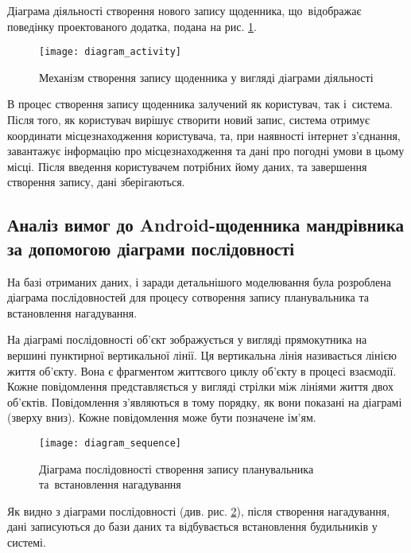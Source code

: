 \documentclass[../main.tex]{subfiles}
\begin{document}

Діаграма діяльності створення нового запису щоденника, що~відображає поведінку проектованого додатка, подана на рис. \ref{diagram:activity}.

\begin{figure}[H]
	\centering
	\texttt{[image: diagram\_activity]}
	\caption{Механізм створення запису щоденника у вигляді діаграми діяльності} %
	\label{diagram:activity}
\end{figure}

В процес створення запису щоденника залучений як користувач, так і~система. Після того, як користувач вирішує створити новий запис, система отримує координати місцезнаходження користувача, та, при наявності інтернет з'єднання, завантажує інформацію про місцезнаходження та дані про погодні умови в цьому місці. Після введення користувачем потрібних йому даних, та завершення створення запису, дані зберігаються.

\subsection{Аналіз вимог до Android-щоденника мандрівника за допомогою діаграми послідовності}
На базі отриманих даних, і заради детальнішого моделювання була розроблена діаграма послідовностей для процесу сотворення запису планувальника та встановлення нагадування.

На діаграмі послідовності об’єкт зображується у вигляді прямокутника на вершині пунктирної вертикальної лінії. Ця вертикальна лінія називається лінією життя об’єкту. Вона є фрагментом життєвого циклу об’єкту в процесі взаємодії. Кожне повідомлення представляється у вигляді стрілки між лініями життя двох об’єктів. Повідомлення з’являються в тому порядку, як вони показані на діаграмі (зверху вниз). Кожне повідомлення може бути позначене ім’ям.


\begin{figure}[H]
	\centering
	\texttt{[image: diagram\_sequence]}
	\caption{Діаграма послідовності створення запису планувальника та~встановлення нагадування} %
	\label{diagram:sequence}
\end{figure}

Як видно з діаграми послідовності (див. рис. \ref{diagram:sequence}), після створення нагадування, дані записуються до бази даних та відбувається встановлення будильників у системі. 
\end{document}
